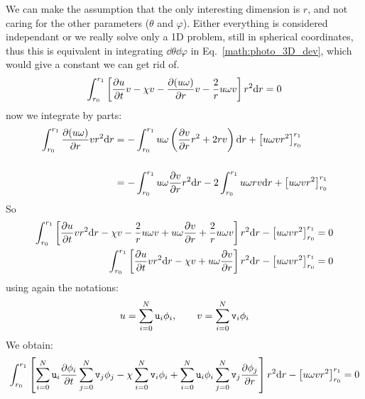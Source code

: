 We can make the assumption that the only interesting dimension is $r$, and
not caring for the other parameters ($\theta$ and $\varphi$). Either everything
is considered independant or we really solve only a 1D problem, still in spherical
coordinates, thus this is equivalent in integrating $\dd\theta\dd\varphi$ in Eq.~\ref{math:photo_3D_dev}, 
which would give a constant we can get rid of.
\begin{equation}
\int_{r_0}^{r_1}\left[   \frac{\partial u}{\partial t} v 
                       - \chi v - \frac{\partial(u\omega)}{\partial r} v
                       - \frac{2}{r}u\omega v
                \right] r^2 \mathrm{d} r = 0
\end{equation}
now we integrate by parts:
\begin{equation}
\begin{split}
\int_{r_0}^{r_1}\frac{\partial(u\omega)}{\partial r} v r^2 \mathrm{d} r 
   & = - \int_{r_0}^{r_1}u\omega \left(\frac{\partial v}{\partial r}r^2 + 2 r v\right) \mathrm{d} r + \left[u\omega v r^2\right]_{r_0}^{r_1}
        \\[\baselineskip]
   & = - \int_{r_0}^{r_1}u\omega \frac{\partial v}{\partial r} r^2  \mathrm{d} r - 2 \int_{r_0}^{r_1}u\omega  r v \mathrm{d} r  + \left[u\omega v r^2\right]_{r_0}^{r_1}
\end{split}
\end{equation}
So
\begin{equation}
\begin{split}
\int_{r_0}^{r_1} \left[   \frac{\partial u}{\partial t} v r^2 \mathrm{d} r
                        - \chi v
                        - \frac{2}{r} u\omega v
                        + u\omega\frac{\partial v}{\partial r}
                        + \frac{2}{r} u\omega v
                 \right] r^2 \mathrm{d} r 
     - \left[u\omega v r^2\right]_{r_0}^{r_1}   & = 0 \\
\int_{r_0}^{r_1} \left[   \frac{\partial u}{\partial t} v r^2 \mathrm{d} r
                        - \chi v
                        + u\omega\frac{\partial v}{\partial r}
                 \right] r^2 \mathrm{d} r 
     - \left[u\omega v r^2\right]_{r_0}^{r_1}   & = 0 
\end{split}
\end{equation}
using again the notations:
\begin{equation}
u = \sum_{i=0}^{N} \mathtt{u}_i \phi_i, \qquad v = \sum_{i=0}^{N} \mathtt{v}_i \phi_i
\end{equation}
We obtain:
\begin{equation}
 \int_{r_0}^{r_1}\left[
                  \sum_{i=0}^{N}\mathtt{u}_i\frac{\partial\phi_i}{\partial t} \sum_{j=0}^{N}\mathtt{v}_j \phi_j
                 - \chi \sum_{i=0}^{N}\mathtt{v}_i\phi_i 
                 + \sum_{i=0}^{N}\mathtt{u}_i\phi_i\sum_{j=0}^{N}\mathtt{v}_j\frac{\partial\phi_j}{\partial r}\right]r^2\mathrm{d} r
 - \left[u\omega v r^2\right]_{r_0}^{r_1} = 0
\end{equation}
